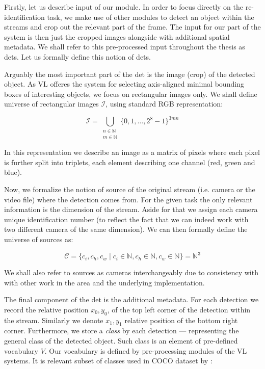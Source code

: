 Firstly, let us describe input of our module. In order to focus directly on the
re-identification task, we make use of other modules to detect an object within
the streams and crop out the relevant part of the frame. The input for our part
of the system is then just the cropped images alongside with additional spatial
metadata. We shall refer to this pre-processed input throughout the thesis as
\glspl{det}. Let us formally define this notion of \glspl{det}.

Arguably the most important part of the \gls{det} is the image (crop)
of the detected object. As \gls{VL} offeres the system for selecting
axis-aligned minimal bounding boxes of interesting objects, we focus on
rectangular images only. We shall define universe of rectangular images
$\mathcal{I}$, using standard RGB representation:

$$\mathcal{I} = \bigcup_{\substack{n \in \mathbb{N} \\ m \in \mathbb{N}}} \{0, 1, \ldots, 2^8-1\}^{3mn}$$


In this representation we describe an image as a matrix of pixels where each
pixel is further split into triplets, each element describing one channel (red,
green and blue).

Now, we formalize the notion of source of the original stream (i.e. camera or
the video file) where the detection comes from. For the given task the only
relevant information is the dimension of the stream. Aside for that we assign
each camera unique identification number (to reflect the fact that we can indeed
work with two different camera of the same dimension). We can then formally
define the universe of sources as:

$$\mathcal{C} = \{c_i, c_h, c_w \mid c_i \in \mathbb{N}, c_h \in \mathbb{N}, c_w \in \mathbb{N}\}
 = \mathbb{N}^3$$
 
We shall also refer to sources as cameras interchangeably due to consistency with
with other work in the area and the underlying implementation.

The final component of the \gls{det} is the additional metadata. For each
detection we record the relative position $x_0, y_0$, of the top left corner of
the detection within the stream. Similarly we denote $x_1, y_1$ relative
position of the bottom right corner. Furthermore, we store a \emph{class} by
each detection --- representing the general class of the detected object. Such
class is an element of pre-defined vocabulary $V$. Our vocabulary is defined
by pre-processing modules of the \gls{VL} systems. It is relevant subset of
classes used in COCO dataset by \cite{cocodataset}:

